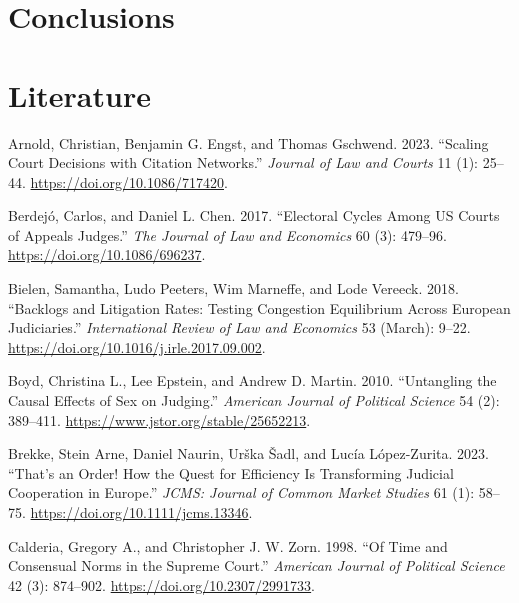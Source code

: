 \documentclass[
  11pt,
]{article}
\newlength{\cslhangindent}
\newenvironment{CSLReferences}[2] %
 {%
  \setlength{\parindent}{0pt}
  \ifodd #1 \everypar{\setlength{\hangindent}{\cslhangindent}}\ignorespaces\fi
  \ifnum #2 > 0
  \setlength{\parskip}{#2\baselineskip}
  \fi
 }%
 {}
\begin{document}
\hypertarget{conclusions}{%
\section{Conclusions}\label{conclusions}}

\vspace{30pt}

\hypertarget{literature}{%
\section*{Literature}\label{literature}}

\hypertarget{refs}{}
\begin{CSLReferences}{1}{0}
\leavevmode{}%
Arnold, Christian, Benjamin G. Engst, and Thomas Gschwend. 2023.
{``Scaling {Court Decisions} with {Citation Networks}.''} \emph{Journal
of Law and Courts} 11 (1): 25--44. \url{https://doi.org/10.1086/717420}.

\leavevmode{}%
Berdejó, Carlos, and Daniel L. Chen. 2017. {``Electoral {Cycles} Among
{US Courts} of {Appeals Judges}.''} \emph{The Journal of Law and
Economics} 60 (3): 479--96. \url{https://doi.org/10.1086/696237}.

\leavevmode{}%
Bielen, Samantha, Ludo Peeters, Wim Marneffe, and Lode Vereeck. 2018.
{``Backlogs and Litigation Rates: {Testing} Congestion Equilibrium
Across {European} Judiciaries.''} \emph{International Review of Law and
Economics} 53 (March): 9--22.
\url{https://doi.org/10.1016/j.irle.2017.09.002}.

\leavevmode{}%
Boyd, Christina L., Lee Epstein, and Andrew D. Martin. 2010.
{``Untangling the {Causal Effects} of {Sex} on {Judging}.''}
\emph{American Journal of Political Science} 54 (2): 389--411.
\url{https://www.jstor.org/stable/25652213}.

\leavevmode{}%
Brekke, Stein Arne, Daniel Naurin, Urška Šadl, and Lucía López-Zurita.
2023. {``That's an {Order}! {How} the {Quest} for {Efficiency Is
Transforming Judicial Cooperation} in {Europe}.''} \emph{JCMS: Journal
of Common Market Studies} 61 (1): 58--75.
\url{https://doi.org/10.1111/jcms.13346}.

\leavevmode{}%
Calderia, Gregory A., and Christopher J. W. Zorn. 1998. {``Of {Time} and
{Consensual Norms} in the {Supreme Court}.''} \emph{American Journal of
Political Science} 42 (3): 874--902.
\url{https://doi.org/10.2307/2991733}.


\end{CSLReferences}
\end{document}
